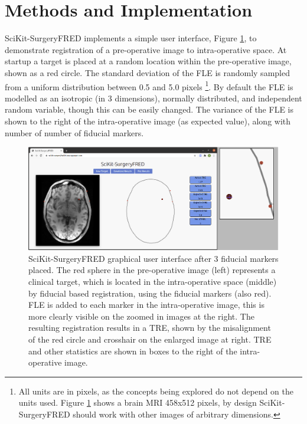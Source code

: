 \section{Methods and Implementation}
SciKit-SurgeryFRED implements a simple user interface, Figure \ref{fig:surgery_fred}, to demonstrate registration of a pre-operative image to intra-operative space. At startup a target is placed at a random location within the pre-operative image, shown as a red circle. The standard deviation of the \gls{FLE} is randomly sampled from a uniform distribution 
between 0.5 and 5.0 pixels \footnote{All units are in pixels, as the concepts being explored do not depend on the units used. Figure 
\ref{fig:surgery_fred} shows a brain MRI 458x512 pixels, by design SciKit-SurgeryFRED should work with other images 
of arbitrary dimensions.}. By default the \gls{FLE} is modelled as an isotropic (in 3 dimensions), normally distributed, and independent random variable, though this can be easily changed. 
The variance of the \gls{FLE} is shown to the right of the intra-operative image (as expected value), along with number of number of fiducial markers. 

\begin{figure}
	\begin{center}
	\includegraphics[width=\linewidth]{scikit-surgeryfred_gui.eps}
		\caption{\label{fig:surgery_fred}SciKit-SurgeryFRED graphical user interface after 3 fiducial markers placed. The red sphere in the pre-operative image (left) represents a clinical target, which is located in the
		intra-operative space (middle) by fiducial based registration, using the fiducial markers (also red). FLE is added to each marker in the intra-operative image, this is more clearly visible on the zoomed in images at the right. The resulting registration results in a TRE, shown by the misalignment of the red circle and crosshair 
		on the enlarged image at right. TRE and other statistics are shown in boxes to the right of the intra-operative image.}
	\end{center}
\end{figure}

